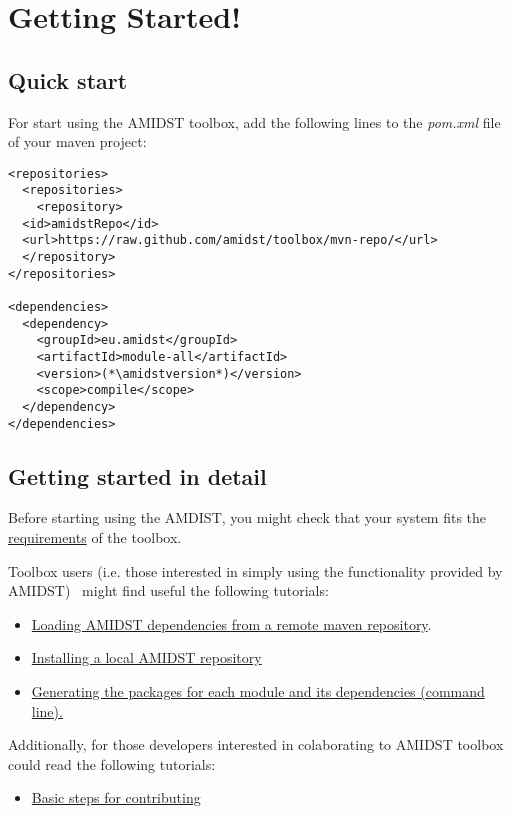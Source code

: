 \documentclass[10pt,a4paper]{report}
\begin{document}
\chapter{Getting Started! }\label{getting-started}



\section{Quick start}

For start using the AMIDST toolbox, add the following lines to the \textit{pom.xml} file of your maven project:


\begin{lstlisting}
<repositories>
  <repositories>
    <repository>
  <id>amidstRepo</id>
  <url>https://raw.github.com/amidst/toolbox/mvn-repo/</url>
  </repository>
</repositories>

<dependencies>
  <dependency>
    <groupId>eu.amidst</groupId>
    <artifactId>module-all</artifactId>
    <version>(*\amidstversion*)</version>
    <scope>compile</scope>
  </dependency>
</dependencies>	
\end{lstlisting}


\section{Getting started in detail}

Before starting using the AMDIST, you might check that your system fits
the \href{requirements.html}{requirements} of the toolbox.\newline 

Toolbox users (i.e. those interested in simply using the functionality
provided by AMIDST)~ might find useful the following tutorials:

\begin{itemize}
	\item
	\href{remoteDeps.html}{Loading AMIDST dependencies from a remote maven
		repository}.
	\item \href{localDeps.html}{Installing a local AMIDST repository}
	\item \href{copydep.html}{Generating the packages for each module and its
		dependencies (command line).}
\end{itemize}

Additionally, for those developers interested in colaborating to AMIDST toolbox could read the following tutorials:

\begin{itemize}
	\item \href{amidst_team_modifications.html}{Basic steps for contributing}
\end{itemize}
\end{document}
